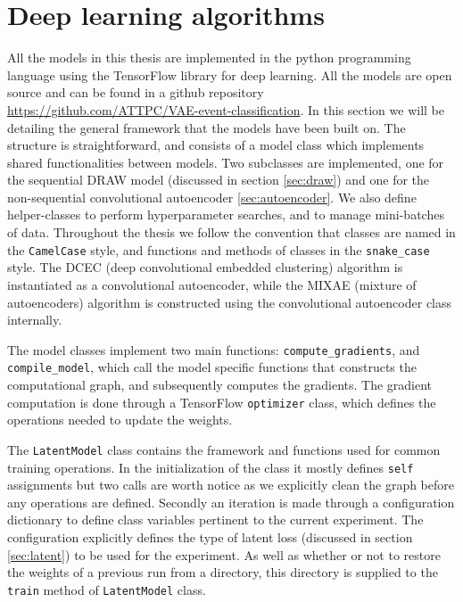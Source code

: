 \section{Deep learning algorithms}

All the models in this thesis are implemented in the python programming language using the TensorFlow library for deep learning. All the models are open source and can be found in a github repository \url{https://github.com/ATTPC/VAE-event-classification}. In this section we will be detailing the general framework that the models have been built on. The structure is straightforward, and consists of a model class which implements shared functionalities between models. Two subclasses are implemented, one for the sequential DRAW model (discussed in section \ref{sec:draw}) and one for the non-sequential convolutional autoencoder \ref{sec:autoencoder}. We also define helper-classes to perform hyperparameter searches, and to manage mini-batches of data. Throughout the thesis we follow the convention that classes are named in the \lstinline{CamelCase} style, and functions and methods of classes in the \lstinline{snake_case} style. The DCEC (deep convolutional embedded clustering) algorithm is instantiated as a convolutional autoencoder, while the MIXAE (mixture of autoencoders) algorithm is constructed using the convolutional autoencoder class internally. 

The model classes implement two main functions: \lstinline{compute_gradients}, and \lstinline{compile_model}, which call the model specific functions that constructs the computational graph, and subsequently computes the gradients. The gradient computation is done through a TensorFlow \lstinline{optimizer} class, which defines the operations needed to update the weights. 

The \lstinline{LatentModel} class contains the framework and functions used for common training operations. In the initialization of the class it mostly defines \lstinline{self} assignments but two calls are worth notice as we explicitly clean the graph before any operations are defined. Secondly an iteration is made through a configuration dictionary to define class variables pertinent to the current experiment. The configuration explicitly defines the type of latent loss (discussed in section \ref{sec:latent}) to be used for the experiment. As well as whether or not to restore the weights of a previous run from a directory, this directory is supplied to the \lstinline{train} method of \lstinline{LatentModel} class. 

